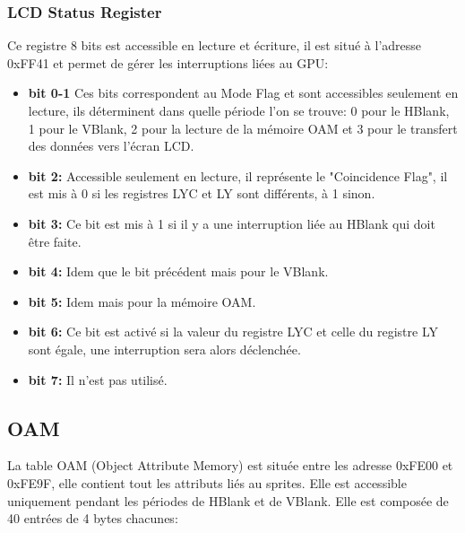 \documentclass{report}
\begin{document}
\subsubsection{LCD Status Register}
Ce registre 8 bits est accessible en lecture et écriture, il est situé à l'adresse 0xFF41 et permet de gérer les interruptions liées au GPU:\\

\begin{itemize}
\item \textbf{bit 0-1}
	Ces bits correspondent au Mode Flag et sont accessibles seulement en lecture, ils déterminent dans quelle période l'on se trouve: 0 pour le HBlank, 1 pour le VBlank, 2 pour la lecture de la mémoire OAM et 3 pour le transfert des données vers l'écran LCD.\\
\item \textbf{bit 2:}
	Accessible seulement en lecture, il représente le "Coincidence Flag", il est mis à 0 si les registres LYC et LY sont différents, à 1 sinon.\\
\item \textbf{bit 3:}
	Ce bit est mis à 1 si il y a une interruption liée au HBlank qui doit être faite.\\
\item \textbf{bit 4:} 
	Idem que le bit précédent mais pour le VBlank.\\
\item \textbf{bit 5:}
	Idem mais pour la mémoire OAM.\\
\item \textbf{bit 6:}
	Ce bit est activé si la valeur du registre LYC et celle du registre LY sont égale, une interruption sera alors déclenchée.\\
\item \textbf{bit 7:}
	Il n'est pas utilisé.\\
\end{itemize}

\subsection{OAM}
	La table OAM (Object Attribute Memory) est située entre les adresse 0xFE00 et 0xFE9F, elle contient tout les attributs liés au sprites. Elle est accessible uniquement pendant les périodes de HBlank et de VBlank. Elle est composée de 40 entrées de 4 bytes chacunes:\\
\end{document}
